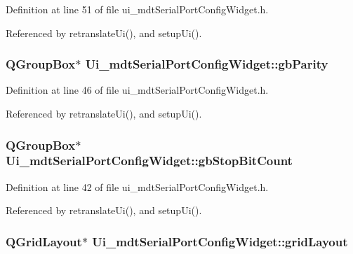 Definition at line 51 of file ui\-\_\-mdt\-Serial\-Port\-Config\-Widget.\-h.



Referenced by retranslate\-Ui(), and setup\-Ui().

\hypertarget{class_ui__mdt_serial_port_config_widget_a43abf18fde6f20b3d3e29bb91b53a819}{
\subsubsection[{gb\-Parity}]{\setlength{\rightskip}{0pt plus 5cm}Q\-Group\-Box$\ast$ Ui\-\_\-mdt\-Serial\-Port\-Config\-Widget\-::gb\-Parity}}\label{class_ui__mdt_serial_port_config_widget_a43abf18fde6f20b3d3e29bb91b53a819}


Definition at line 46 of file ui\-\_\-mdt\-Serial\-Port\-Config\-Widget.\-h.



Referenced by retranslate\-Ui(), and setup\-Ui().

\hypertarget{class_ui__mdt_serial_port_config_widget_af4773ada5dc036975dafd930a3cd2402}{
\subsubsection[{gb\-Stop\-Bit\-Count}]{\setlength{\rightskip}{0pt plus 5cm}Q\-Group\-Box$\ast$ Ui\-\_\-mdt\-Serial\-Port\-Config\-Widget\-::gb\-Stop\-Bit\-Count}}\label{class_ui__mdt_serial_port_config_widget_af4773ada5dc036975dafd930a3cd2402}


Definition at line 42 of file ui\-\_\-mdt\-Serial\-Port\-Config\-Widget.\-h.



Referenced by retranslate\-Ui(), and setup\-Ui().

\hypertarget{class_ui__mdt_serial_port_config_widget_a5d484ab611a79ce3bb00c9eabae59641}{
\subsubsection[{grid\-Layout}]{\setlength{\rightskip}{0pt plus 5cm}Q\-Grid\-Layout$\ast$ Ui\-\_\-mdt\-Serial\-Port\-Config\-Widget\-::grid\-Layout}}\label{class_ui__mdt_serial_port_config_widget_a5d484ab611a79ce3bb00c9eabae59641}


